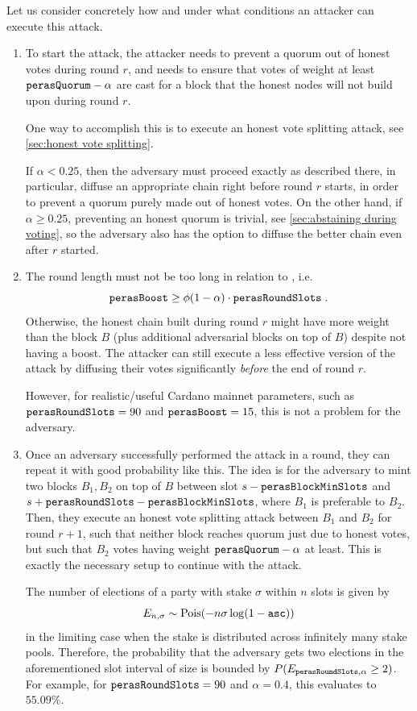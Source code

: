 \medskip
Let us consider concretely how and under what conditions an attacker can execute this attack.
\begin{enumerate}
\item
  To start the attack, the attacker needs to prevent a quorum out of honest votes during round $r$, and needs to ensure that votes of weight at least $\mathtt{perasQuorum} - \alpha$ are cast for a block that the honest nodes will not build upon during round $r$.

  One way to accomplish this is to execute an honest vote splitting attack, see \cref{sec:honest vote splitting}.

  If $\alpha<0.25$, then the adversary must proceed exactly as described there, in particular, diffuse an appropriate chain right before round $r$ starts, in order to prevent a quorum purely made out of honest votes.
  On the other hand, if $\alpha\ge 0.25$, preventing an honest quorum is trivial, see \cref{sec:abstaining during voting}, so the adversary also has the option to diffuse the better chain even after $r$ started.
\item
  The round length \perasRoundSlots{} must not be too long in relation to \perasBoost{}, i.e.
  \[ \mathtt{perasBoost} \ge \phi(1-\alpha)\cdot \mathtt{perasRoundSlots} \;. \]
  Otherwise, the honest chain built during round $r$ might have more weight than the block $B$ (plus additional adversarial blocks on top of $B$) despite not having a boost.
  The attacker can still execute a less effective version of the attack by diffusing their votes significantly \emph{before} the end of round $r$.

  However, for realistic/useful Cardano mainnet parameters, such as $\mathtt{perasRoundSlots} = 90$ and $\mathtt{perasBoost} = 15$, this is not a problem for the adversary.
\item
  Once an adversary successfully performed the attack in a round, they can repeat it with good probability like this.
  The idea is for the adversary to mint two blocks $B_1,B_2$ on top of $B$ between slot $s-\mathtt{perasBlockMinSlots}$ and $s+\mathtt{perasRoundSlots} -\mathtt{perasBlockMinSlots}$, where $B_1$ is preferable to $B_2$.
  Then, they execute an honest vote splitting attack between $B_1$ and $B_2$ for round $r+1$, such that neither block reaches quorum just due to honest votes, but such that $B_2$ votes having weight $\mathtt{perasQuorum} - \alpha$ at least.
  This is exactly the necessary setup to continue with the attack.

  The number of elections of a party with stake $\sigma$ within $n$ slots is given by
  \[ E_{n,\sigma}\sim\operatorname{Pois}(-n\sigma\log(1-\mathtt{asc})) \]
  in the limiting case when the stake is distributed across infinitely many stake pools.
  Therefore, the probability that the adversary gets two elections in the aforementioned slot interval of size \perasRoundSlots{} is bounded by $P(E_{\mathtt{perasRoundSlots},\alpha}\ge 2)$.
  For example, for $\mathtt{perasRoundSlots} = 90$ and $\alpha=0.4$, this evaluates to $55.09\%$.


\end{enumerate}
